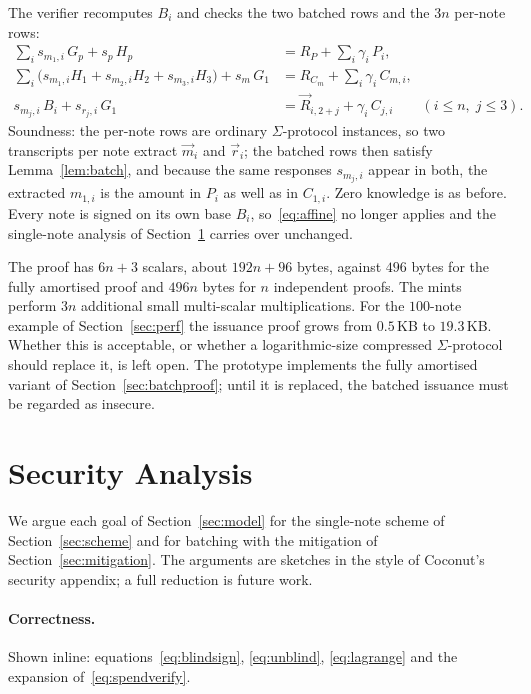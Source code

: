 \documentclass[10pt,a5paper]{article}
\newcommand{\K}[1]{#1}                      %
\newcommand{\Go}[1]{#1}                     %
\newcommand{\K}[1]{{\color{ScalarCol}#1}}   %
\newcommand{\Go}[1]{{\color{GoneCol}#1}}    %
\newcommand{\vv}[1]{\vec{#1}}
\begin{document}
The verifier recomputes $\Go{B_i}$ and checks the two batched rows and the
$3n$ per-note rows:
\begin{align}
  \textstyle\sum_i \K{s_{m_1,i}}\,\Go{G_p} + \K{s_p}\,\Go{H_p} &= \Go{R_P} + \textstyle\sum_i \K{\gamma_i}\,\Go{P_i}, \\
  \textstyle\sum_i \bigl(\K{s_{m_1,i}}\Go{H_1} + \K{s_{m_2,i}}\Go{H_2} + \K{s_{m_3,i}}\Go{H_3}\bigr) + \K{s_m}\,\Go{G_1} &= \Go{R_{C_m}} + \textstyle\sum_i \K{\gamma_i}\,\Go{C_{m,i}}, \\
  \K{s_{m_j,i}}\,\Go{B_i} + \K{s_{r_j,i}}\,\Go{G_1} &= \vv{R}_{i,2+j} + \K{\gamma_i}\,\Go{C_{j,i}} \qquad (i \le n,\; j \le 3).
\end{align}
Soundness: the per-note rows are ordinary $\Sigma$-protocol instances, so two
transcripts per note extract $\vv{m}_i$ and $\vv{r}_i$; the batched rows then
satisfy Lemma~\ref{lem:batch}, and because the same responses $\K{s_{m_j,i}}$
appear in both, the extracted $\K{m_{1,i}}$ is the amount in $\Go{P_i}$ as well
as in $\Go{C_{1,i}}$. Zero knowledge is as before. Every note is signed on its
own base $\Go{B_i}$, so~\eqref{eq:affine} no longer applies and the
single-note analysis of Section~\ref{sec:analysis} carries over unchanged.

The proof has $6n + 3$ scalars, about $192n + 96$ bytes, against $496$ bytes
for the fully amortised proof and $496n$ bytes for $n$ independent proofs. The
mints perform $3n$ additional small multi-scalar multiplications. For the
$100$-note example of Section~\ref{sec:perf} the issuance proof grows from
$0.5$\,KB to $19.3$\,KB. Whether this is acceptable, or whether a
logarithmic-size compressed $\Sigma$-protocol~\cite{acf21} should replace it,
is left open. The prototype implements the fully amortised variant of
Section~\ref{sec:batchproof}; until it is replaced, the batched issuance must be
regarded as insecure.

\section{Security Analysis}
\label{sec:analysis}

We argue each goal of Section~\ref{sec:model} for the single-note scheme of
Section~\ref{sec:scheme} and for batching with the mitigation of
Section~\ref{sec:mitigation}. The arguments are sketches in the style of
Coconut's security appendix; a full reduction is future work.

\paragraph{Correctness.} Shown inline: equations~\eqref{eq:blindsign},
\eqref{eq:unblind}, \eqref{eq:lagrange} and the expansion
of~\eqref{eq:spendverify}.
\end{document}
